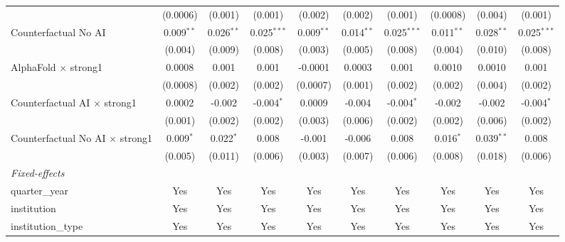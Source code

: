 \begin{tabular}{lccccccccc}
                                          & (0.0006)     & (0.001)       & (0.001)       & (0.002)      & (0.002)      & (0.001)       & (0.0008)     & (0.004)       & (0.001)\\   
   Counterfactual No AI                   & 0.009$^{**}$ & 0.026$^{**}$  & 0.025$^{***}$ & 0.009$^{**}$ & 0.014$^{**}$ & 0.025$^{***}$ & 0.011$^{**}$ & 0.028$^{**}$  & 0.025$^{***}$\\   
                                          & (0.004)      & (0.009)       & (0.008)       & (0.003)      & (0.005)      & (0.008)       & (0.004)      & (0.010)       & (0.008)\\   
   AlphaFold $\times$ strong1             & 0.0008       & 0.001         & 0.001         & -0.0001      & 0.0003       & 0.001         & 0.0010       & 0.0010        & 0.001\\   
                                          & (0.0008)     & (0.002)       & (0.002)       & (0.0007)     & (0.001)      & (0.002)       & (0.002)      & (0.004)       & (0.002)\\   
   Counterfactual AI $\times$ strong1     & 0.0002       & -0.002        & -0.004$^{*}$  & 0.0009       & -0.004       & -0.004$^{*}$  & -0.002       & -0.002        & -0.004$^{*}$\\   
                                          & (0.001)      & (0.002)       & (0.002)       & (0.003)      & (0.006)      & (0.002)       & (0.002)      & (0.006)       & (0.002)\\   
   Counterfactual No AI $\times$ strong1  & 0.009$^{*}$  & 0.022$^{*}$   & 0.008         & -0.001       & -0.006       & 0.008         & 0.016$^{*}$  & 0.039$^{**}$  & 0.008\\   
                                          & (0.005)      & (0.011)       & (0.006)       & (0.003)      & (0.007)      & (0.006)       & (0.008)      & (0.018)       & (0.006)\\   
   \midrule
   \emph{Fixed-effects}\\
   quarter\_year                          & Yes          & Yes           & Yes           & Yes          & Yes          & Yes           & Yes          & Yes           & Yes\\  
   institution                            & Yes          & Yes           & Yes           & Yes          & Yes          & Yes           & Yes          & Yes           & Yes\\  
   institution\_type                      & Yes          & Yes           & Yes           & Yes          & Yes          & Yes           & Yes          & Yes           & Yes\\  

\end{tabular}
